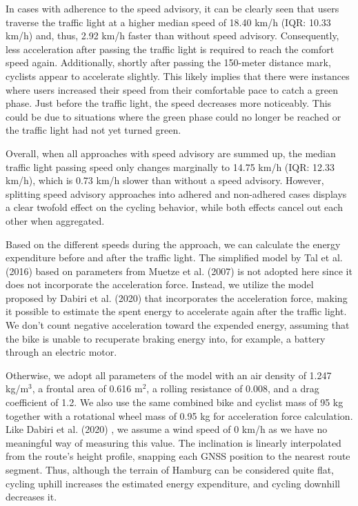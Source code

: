 In cases with adherence to the speed advisory, it can be clearly seen that users traverse the traffic light at a higher median speed of 18.40 km/h (IQR: 10.33 km/h) and, thus, 2.92 km/h faster than without speed advisory. Consequently, less acceleration after passing the traffic light is required to reach the comfort speed again. Additionally, shortly after passing the 150-meter distance mark, cyclists appear to accelerate slightly. This likely implies that there were instances where users increased their speed from their comfortable pace to catch a green phase. Just before the traffic light, the speed decreases more noticeably. This could be due to situations where the green phase could no longer be reached or the traffic light had not yet turned green.

Overall, when all approaches with speed advisory are summed up, the median traffic light passing speed only changes marginally to 14.75 km/h (IQR: 12.33 km/h), which is 0.73 km/h slower than without a speed advisory. However, splitting speed advisory approaches into adhered and non-adhered cases displays a clear twofold effect on the cycling behavior, while both effects cancel out each other when aggregated.

Based on the different speeds during the approach, we can calculate the energy expenditure before and after the traffic light. The simplified model by Tal et al. (2016) \cite{tal_vehicular-communications-based_2016} based on parameters from Muetze et al. (2007) \cite{muetze_electric_2007} is not adopted here since it does not incorporate the acceleration force. Instead, we utilize the model proposed by Dabiri et al. (2020) \cite{dabiri_optimized_2020} that incorporates the acceleration force, making it possible to estimate the spent energy to accelerate again after the traffic light. We don't count negative acceleration toward the expended energy, assuming that the bike is unable to recuperate braking energy into, for example, a battery through an electric motor.

Otherwise, we adopt all parameters of the model with an air density of 1.247 kg/m$^3$, a frontal area of 0.616 m$^2$, a rolling resistance of 0.008, and a drag coefficient of 1.2. We also use the same combined bike and cyclist mass of 95 kg together with a rotational wheel mass of 0.95 kg for acceleration force calculation. Like Dabiri et al. (2020) \cite{dabiri_optimized_2020}, we assume a wind speed of 0 km/h as we have no meaningful way of measuring this value. The inclination is linearly interpolated from the route's height profile, snapping each GNSS position to the nearest route segment. Thus, although the terrain of Hamburg can be considered quite flat, cycling uphill increases the estimated energy expenditure, and cycling downhill decreases it.

